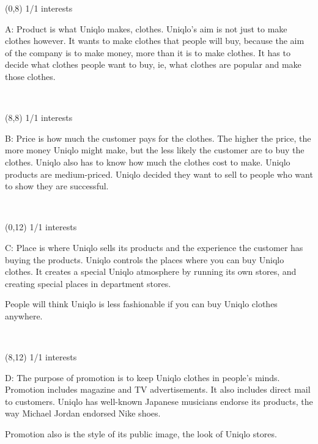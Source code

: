 \documentclass[a4paper]{article}
\newcommand{\mycard}[5]{%
	\vspace{0.1cm}
	\small #1 #2
	\par
	\parbox[t][6.7cm][c]{9.5cm}{%
	\hspace{0.1cm} \Large#3\\
	\normalsize#4 #5
	}
}
\begin{document}
\begin{textblock}{8}(0,8)
\mycard{1/1}{interests}{\parbox{9.0cm}{
A: Product is what Uniqlo makes, clothes. Uniqlo's aim is not just to make clothes however. It wants to make clothes that people will buy, because the aim of the company is to make money, more than it is to make clothes. It has to decide what clothes people want to buy, ie, what clothes are popular and make those clothes.
}}{}{} 
\end{textblock}

\begin{textblock}{8}(8,8)
\mycard{1/1}{interests}{\parbox{9.0cm}{
B: Price is how much the customer pays for the clothes. The higher the price, the more money Uniqlo might make, but the less likely the customer are to buy the clothes. Uniqlo also has to know how much the clothes cost to make.
Uniqlo products are medium-priced. Uniqlo decided they want to sell to people who want to show they are successful.
}}{}{} 
\end{textblock}

\begin{textblock}{8}(0,12)
\mycard{1/1}{interests}{\parbox{9.0cm}{
C: Place is where Uniqlo sells its products and the experience the customer has buying the products. Uniqlo controls the places where you can buy Uniqlo clothes. It creates a special Uniqlo atmosphere by running its own stores, and creating special places in department stores.

People will think Uniqlo is less fashionable if you can buy Uniqlo clothes anywhere.
}}{}{} 
\end{textblock}

\begin{textblock}{8}(8,12)
\mycard{1/1}{interests}{\parbox{9.0cm}{
D: The purpose of promotion is to keep Uniqlo clothes in people's minds. Promotion includes magazine and TV advertisements. It also includes direct mail to customers. Uniqlo has well-known Japanese musicians endorse its products, the way Michael Jordan endorsed Nike shoes.

Promotion also is the style of its public image, the look of Uniqlo stores.
}}{}{} 
\end{textblock}
\end{document}
